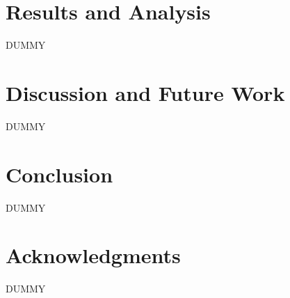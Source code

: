 \documentclass[11pt,twocolumn]{article}
\begin{document}
\section{Results and Analysis}
DUMMY

\section{Discussion and Future Work}
DUMMY

\section{Conclusion}
DUMMY

\section*{Acknowledgments}
DUMMY
\end{document}
